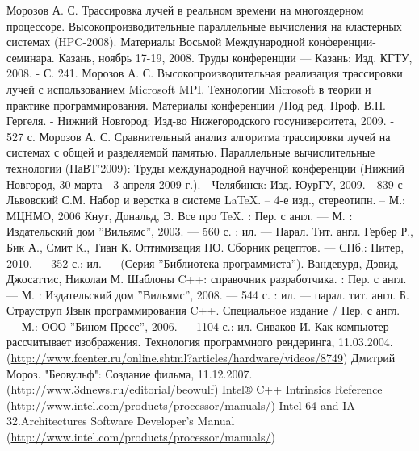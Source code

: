 \documentclass[12pt, a4paper]{article}
\begin{document}
\newpage
\begin{thebibliography}{99}
	 Морозов А. С. Трассировка лучей в реальном времени на многоядерном процессоре. Высокопроизводительные параллельные вычисления на кластерных системах (HPC-2008). Материалы Восьмой Международной конференции-семинара. Казань, ноябрь 17-19, 2008. Труды конференции — Казань: Изд. КГТУ, 2008. - С. 241.
	 Морозов А. С. Высокопроизводительная реализация трассировки лучей с использованием Microsoft MPI. Технологии Microsoft в теории и практике программирования. Материалы конференции /Под ред. Проф. В.П. Гергеля. - Нижний Новгород: Изд-во Нижегородского госуниверситета, 2009. - 527 с.
	 Морозов А. С. Сравнительный анализ алгоритма трассировки лучей на системах с общей и разделяемой памятью. Параллельные вычислительные технологии (ПаВТ’2009): Труды международной научной конференции (Нижний Новгород, 30 марта - 3 апреля 2009 г.). - Челябинск: Изд. ЮурГУ, 2009. - 839 с
	 Львовский С.М. Набор и верстка в системе \LaTeX. – 4-е изд., стереотипн. – М.: МЦНМО, 2006
	 Кнут, Дональд, Э. Все про \TeX. : Пер. с англ. --- М. : Издательский дом ''Вильямс'', 2003. --- 560 с. : ил. --- Парал. Тит. англ.
	 Гербер Р., Бик А., Смит К., Тиан К. Оптимизация ПО. Сборник рецептов. --- СПб.: Питер, 2010. --- 352 с.: ил. --- (Серия ''Библиотека программиста'').
	 Вандевурд, Дэвид, Джосаттис, Николаи М. Шаблоны C++: справочник разработчика. : Пер. с англ. --- М. : Издательский дом ''Вильямс'', 2008. --- 544 с. : ил. --- парал. тит. англ.
	 Б. Страуструп Язык программирования C++. Специальное издание / Пер. с англ. --- М.: ООО ''Бином-Пресс'', 2006. --- 1104 с.: ил.
	 Сиваков И. Как компьютер рассчитывает изображения. Технология программного рендеринга, 11.03.2004. \\ (\href{http://www.fcenter.ru/online.shtml?articles/hardware/videos/8749}{http://www.fcenter.ru/online.shtml?articles/hardware/videos/8749})
	 Дмитрий Мороз. "Беовульф": Создание фильма, 11.12.2007.\\ (\href{http://www.3dnews.ru/editorial/beowulf}{http://www.3dnews.ru/editorial/beowulf})
	 Intel® C++ Intrinsics Reference \\ (\href{http://www.intel.com/products/processor/manuals/}{http://www.intel.com/products/processor/manuals/})
	 Intel 64 and IA-32.Architectures Software Developer's Manual \\ (\href{http://www.intel.com/products/processor/manuals/}{http://www.intel.com/products/processor/manuals/})

\end{thebibliography}
\end{document}
